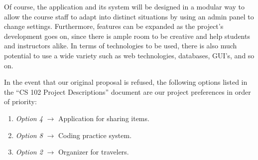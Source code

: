 \documentclass[12pt]{article}
\begin{document}
    \noindent Of course, the application and its system will be designed in a modular
    way to allow the course staff to adapt into distinct situations by using
    an admin panel to change settings. Furthermore, features can be expanded
    as the project's development goes on, since there is ample room to be
    creative and help students and instructors alike. In terms of
    technologies to be used, there is also much potential to use a wide
    variety such as web technologies, databases, GUI's, and so on.

    \noindent In the event that our original proposal is refused, the following
    options listed in the ``CS 102 Project Descriptions'' document are our
    project preferences in order of priority:

    \begin{enumerate}
        \itemsep1pt\parskip0pt
        \item \textit{Option 4} $\rightarrow$ \textnormal{Application for sharing items.}
        \item \textit{Option 8} $\rightarrow$ \textnormal{Coding practice system.}
        \item \textit{Option 2} $\rightarrow$ \textnormal{Organizer for travelers.}
    \end{enumerate}
\end{document}
